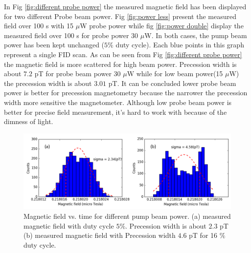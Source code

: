  In Fig \ref{fig:different probe power} the measured magnetic field has been displayed for two different  Probe beam power. Fig \ref{fig:power less} present the measured field over 100 s with 15 $\mu$W probe power while fig \ref{fig:power double} display the measured field over 100 s for probe power 30 $\mu$W. In both cases, the pump beam power has been kept unchanged ($5\%$ duty cycle). Each blue points in this graph represent a single FID scan. As can be seen from Fig \ref{fig:different probe power} the magnetic field is more scattered for high beam power. Precession width is about $7.2$ pT for probe beam power 30 $\mu$W while for low beam power(15 $\mu$W) the precession width is about $3.01$ pT. It can be concluded lower probe beam power is better for precession  magnetometry because the narrower the precession width more sensitive the magnetometer. Although low probe beam power is better for precise field measurement, it's hard to work with because of the dimness of light.
 
 \begin{figure}
    \centering  \includegraphics[width=\textwidth]{figures/pump_beam}
    \caption{ Magnetic field vs. time for different pump beam power. (a) measured magnetic field with duty cycle $5 \%$. Precession width is about $2.3$ pT (b) measured magnetic field with Precession width $4.6$ pT for  16 $\%$ duty cycle.}
    \label{fig:different pump power}
\end{figure}

